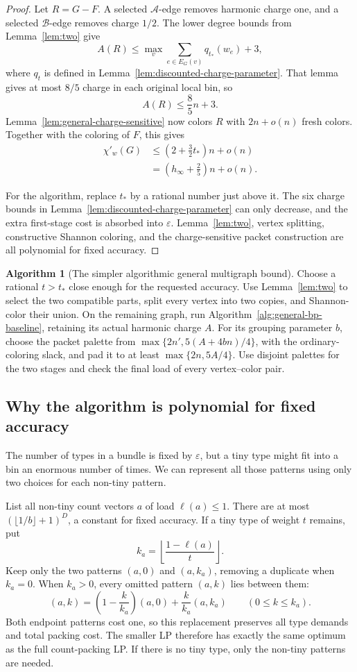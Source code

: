 \documentclass[11pt]{article}
\theoremstyle{definition}\newtheorem{algorithm}{Algorithm}[section]
\numberwithin{equation}{section}
\theoremstyle{remark}\newtheorem*{remark}{Remark}
\begin{document}
\begin{proof}
Let $R=G-F$.  A selected $\mathcal A$-edge removes harmonic charge one,
and a selected $\mathcal B$-edge removes charge $1/2$.  The lower degree
bounds from Lemma~\ref{lem:two} give
\[
 A(R)\le
 \max_v\sum_{e\in E_G(v)}q_{t_*}(w_e)+3,
\]
where $q_t$ is defined in Lemma~\ref{lem:discounted-charge-parameter}.
That lemma gives at most $8/5$ charge in each original local bin, so
\[
 A(R)\le\frac85n+3.
\]
Lemma~\ref{lem:general-charge-sensitive} now colors $R$ with
$2n+o(n)$ fresh colors.  Together with the coloring of $F$, this gives
\begin{align*}
 \chi'_w(G)
 &\le\left(2+\frac32t_*\right)n+o(n)\\
 &=\left(h_\infty+\frac25\right)n+o(n).
\end{align*}

For the algorithm, replace $t_*$ by a rational number just above it.
The six charge bounds in Lemma~\ref{lem:discounted-charge-parameter}
can only decrease, and the extra first-stage cost is absorbed into
$\varepsilon$.  Lemma~\ref{lem:two}, vertex splitting, constructive
Shannon coloring, and the charge-sensitive packet construction are all
polynomial for fixed accuracy.
\end{proof}

\begin{algorithm}[The simpler algorithmic general multigraph bound]
\label{alg:general-bp-improved}
Choose a rational $t>t_*$ close enough for the requested accuracy.
Use Lemma~\ref{lem:two} to select the two compatible parts, split every
vertex into two copies, and Shannon-color their union.  On the remaining
graph, run Algorithm~\ref{alg:general-bp-baseline}, retaining its actual
harmonic charge $A$.  For its grouping parameter $b$, choose the packet
palette from
$\max\{2n',5(A+4bn)/4\}$, with the ordinary-coloring slack, and pad it
to at least $\max\{2n,5A/4\}$.  Use disjoint palettes for the two stages
and check the final load of every vertex--color pair.
\end{algorithm}

\subsection{Why the algorithm is polynomial for fixed accuracy}
The number of types in a bundle is fixed by $\varepsilon$, but a tiny
type might fit into a bin an enormous number of times. We can represent
all those patterns using only two choices for each non-tiny pattern.

List all non-tiny count vectors $a$ of load $\ell(a)\le1$. There
are at most $(\lfloor1/b\rfloor+1)^D$, a constant for fixed accuracy.
If a tiny type of weight $t$ remains, put
\[
 k_a=\left\lfloor\frac{1-\ell(a)}{t}\right\rfloor.
\]
Keep only the two patterns $(a,0)$ and $(a,k_a)$, removing a duplicate
when $k_a=0$. When $k_a>0$, every omitted pattern $(a,k)$ lies between them:
\[
 (a,k)=\left(1-\frac{k}{k_a}\right)(a,0)
             +\frac{k}{k_a}(a,k_a)\qquad(0\le k\le k_a).
\]
Both endpoint patterns cost one, so this replacement preserves all
type demands and total packing cost. The smaller LP therefore has
exactly the same optimum as the full count-packing LP. If there is no
tiny type, only the non-tiny patterns are needed.
\end{document}
